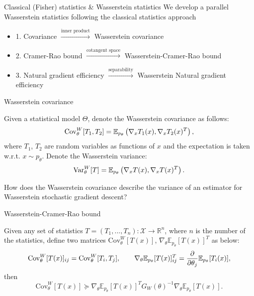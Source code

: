 \documentclass{beamer}
\begin{document}
\begin{frame}{Classical (Fisher) statistics \& Wasserstein statistics}
    We develop a parallel Wasserstein statistics following the classical statistics approach
    \begin{itemize}
        \item 1. Covariance $\stackrel{\text{inner product}}{\longrightarrow}$ Wasserstein covariance
        \item 2. Cramer-Rao bound $\stackrel{\text{cotangent space}}{\longrightarrow}$ Wasserstein-Cramer-Rao bound
        \item 3. Natural gradient efficiency $\stackrel{\text{separability}}{\longrightarrow}$ Wasserstein Natural gradient efficiency
    \end{itemize}   

\end{frame}

\begin{frame}{Wasserstein covariance}

\begin{definition}
Given a statistical model $\Theta$, denote the Wasserstein covariance as follows:
\begin{equation*}
\mathrm{Cov}^W_\theta[T_1, T_2]=\mathbb{E}_{p_\theta} \left( \nabla_x T_1(x), \nabla_x T_2(x)^{T} \right),
\end{equation*}
where $T_1$, $T_2$ are random variables as functions of $x$ and the expectation is taken w.r.t. $x \sim p_\theta$. 
Denote the Wasserstein variance: 
\begin{equation*}
\mathrm{Var}^W_\theta[T] = \mathbb{E}_{p_\theta} \left( \nabla_x T(x), \nabla_x T(x)^{T} \right).
\end{equation*}
\end{definition} 
\begin{problem}
How does the Wasserstein covariance describe the variance of an estimator for Wasserstein stochastic gradient descent?
\end{problem}
\end{frame}

\begin{frame}{Wasserstein-Cramer-Rao bound}
\begin{theorem}\label{WCR}
Given any set of statistics $T = \left( T_1,...,T_n\right) \colon \mathcal{X}\rightarrow \mathbb{R}^n$, where $n$ is the number of the statistics, define two matrices $\mathrm{Cov}^W_\theta[T(x)]$, $ \nabla_\theta \mathbb{E}_{p_\theta} [T(x)]^{T}$ as below:
\begin{equation*}
    \mathrm{Cov}^W_\theta[T(x)]_{ij} = \mathrm{Cov}^W_\theta[T_i,T_j], \qquad \nabla_\theta \mathbb{E}_{p_\theta} [T(x)]^{T}_{ij} = \frac{\partial}{\partial \theta_j} \mathbb{E}_{p_\theta} [T_i(x)],
\end{equation*}
then
\begin{equation*}
\mathrm{Cov}^W_\theta[T(x)] \succeq \nabla_\theta \mathbb{E}_{p_\theta} [T(x)]^{T}G_W(\theta)^{-1}\nabla_\theta \mathbb{E}_{p_\theta} [T(x)]. 
\end{equation*}
\end{theorem}
\end{frame}
\end{document}
